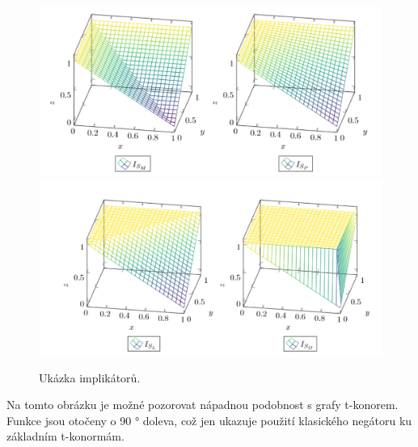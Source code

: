     \begin{figure}[H]
    \caption{ Uk\' azka implik\' ator\r u.}
                \hspace{-1cm}
                \includegraphics[scale=0.65]{template-fig/impl1.pdf}
                \centering
                \hspace{1cm}
                \includegraphics[scale=0.65]{template-fig/impl2.pdf}
                \centering
    \end{figure}

Na tomto obrázku je možné pozorovat nápadnou podobnost s grafy t-konorem. Funkce jsou otočeny o 90 ° doleva, což jen ukazuje použití klasick\' eho negátoru ku základním t-konormám. 


